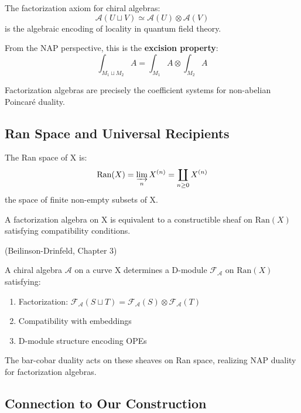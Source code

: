 \begin{example}
\begin{principle}\label{princ:factorization-locality}
The factorization axiom for chiral algebras:
$$\mathcal{A}(U \sqcup V) \simeq \mathcal{A}(U) \otimes \mathcal{A}(V)$$
is the algebraic encoding of locality in quantum field theory.

From the NAP perspective, this is the \textbf{excision property}:
$$\int_{M_1 \sqcup M_2} A = \int_{M_1} A \otimes \int_{M_2} A$$

Factorization algebras are precisely the coefficient systems for non-abelian Poincaré duality.
\end{principle}

\subsection{Ran Space and Universal Recipients}

\begin{definition}\label{def:ran-space}
The Ran space of X is:
$$\text{Ran}(X) = \varinjlim_{n} X^{(n)} = \coprod_{n \geq 0} X^{(n)}$$
the space of finite non-empty subsets of X.

A factorization algebra on X is equivalent to a constructible sheaf on $\text{Ran}(X)$ satisfying compatibility conditions.
\end{definition}

\begin{theorem}\label{thm:chiral-ran}
\textup{(Beilinson-Drinfeld, Chapter 3)}

A chiral algebra $\mathcal{A}$ on a curve X determines a D-module $\mathcal{F}_{\mathcal{A}}$ on $\text{Ran}(X)$ satisfying:
\begin{enumerate}
\item Factorization: $\mathcal{F}_{\mathcal{A}}(S \sqcup T) = \mathcal{F}_{\mathcal{A}}(S) \otimes \mathcal{F}_{\mathcal{A}}(T)$
\item Compatibility with embeddings
\item D-module structure encoding OPEs
\end{enumerate}

The bar-cobar duality acts on these sheaves on Ran space, realizing NAP duality for factorization algebras.
\end{theorem}

\subsection{Connection to Our Construction}


\end{example}

